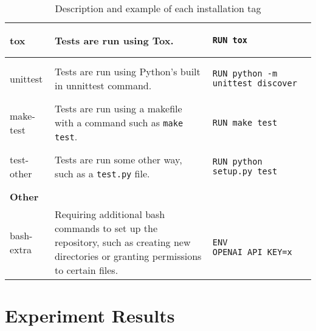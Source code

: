 \documentclass[conference]{IEEEtran}
\begin{document}
\begin{table}[!h]
\begin{tabular}{|lp{}l|}
\multicolumn{1}{|l|}{tox} & \multicolumn{1}{p{0.4\textwidth}|}{Tests are run using Tox.}
    & \begin{lstlisting}
RUN tox
    \end{lstlisting} \\ \hline
\multicolumn{1}{|l|}{unittest}           & \multicolumn{1}{p{0.4\textwidth}|}{Tests are run using Python's built in unnittest command.} 
    & \begin{lstlisting}
RUN python -m unittest discover
    \end{lstlisting} \\ \hline
\multicolumn{1}{|l|}{make-test}          & \multicolumn{1}{p{0.4\textwidth}|}{Tests are run using a makefile with a command such as \texttt{make test}.}
    & \begin{lstlisting}
RUN make test
    \end{lstlisting} \\ \hline
\multicolumn{1}{|l|}{test-other}         & \multicolumn{1}{p{0.4\textwidth}|}{Tests are run some other way, such as a \texttt{test.py} file.} 
    & \begin{lstlisting}
RUN python setup.py test
    \end{lstlisting}\\ \hline
\textbf{Other}                           &                                                                                                                                                                                                  &         \\ \hline
\multicolumn{1}{|l|}{bash-extra}         & \multicolumn{1}{p{0.4\textwidth}|}{Requiring additional bash commands to set up the repository, such as creating new directories or granting permissions to certain files.}
& \begin{lstlisting}

ENV OPENAI_API_KEY=x    
\end{lstlisting}\\ \hline
\end{tabular}
\caption{Description and example of each installation tag}
\end{table}

\newpage
\section{Experiment Results}
\end{document}
